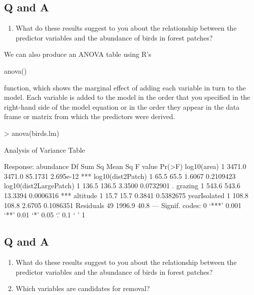 \documentclass[letterpaper,10pt]{article}
\newenvironment{rline}{\begin{small}\begin{ttfamily}}{\end{ttfamily}\end{small}}
\begin{document}
\subsection*{Q and A}
\begin{enumerate}
\item What do these results suggest to you about the relationship between the predictor variables and the abundance of birds in forest patches?
\end{enumerate}

We can also produce an ANOVA table using R's \begin{rline}anova()\end{rline} function, which shows the marginal effect of adding each variable in turn to the model. Each variable is added to the model in the order that you specified in the right-hand side of the model equation or in the order they appear in the data frame or matrix from which the predictors were derived.

\begin{Schunk}
\begin{Sinput}
> anova(birds.lm)
\end{Sinput}
\begin{Soutput}
Analysis of Variance Table

Response: abundance
                       Df Sum Sq Mean Sq F value    Pr(>F)    
log10(area)             1 3471.0  3471.0 85.1731 2.695e-12 ***
log10(dist2Patch)       1   65.5    65.5  1.6067 0.2109423    
log10(dist2LargePatch)  1  136.5   136.5  3.3500 0.0732901 .  
grazing                 1  543.6   543.6 13.3394 0.0006316 ***
altitude                1   15.7    15.7  0.3841 0.5382675    
yearIsolated            1  108.8   108.8  2.6705 0.1086351    
Residuals              49 1996.9    40.8                      
---
Signif. codes:  0 ‘***’ 0.001 ‘**’ 0.01 ‘*’ 0.05 ‘.’ 0.1 ‘ ’ 1
\end{Soutput}
\end{Schunk}

\subsection*{Q and A}
\begin{enumerate}
\item What do these results suggest to you about the relationship between the predictor variables and the abundance of birds in forest patches?
\item Which variables are candidates for removal?
\end{enumerate}
\end{document}
